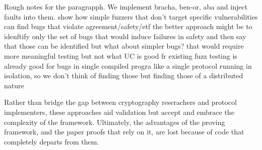 Rough notes for the paragrapph. 
We implement bracha, ben-or, aba and inject faults into them. show how simple fuzzers that don't target specific vulnerabilities can find bugs that violate agreement/safety/etf
the better approach might be to idenftify only the set of bugs that would induce failures in safety and then say that those can be identified
but what about simpler bugs? that would require more meaningful testing but not what UC is good fr
existing fuzz testing is already good for bugs in single compiled progra like a single protocol running in isolation, so we don't think of finding those
but finding those of a distributed nature


Rather than bridge the gap between cryptography reserachers and protocol implementers, these approaches aid validation but accept and embrace the complexity of the framework.
Ultimately, the advantages of the proving framework, and the paper proofs that rely on it, are lost because of code that completely departs from them. 




